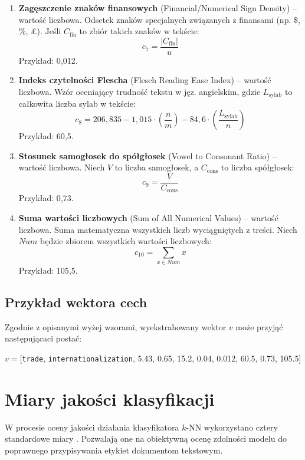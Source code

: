 \documentclass{article}
\begin{document}
\begin{enumerate}
	\item \textbf{Zagęszczenie znaków finansowych} (Financial/Numerical Sign Density) – wartość liczbowa. Odsetek znaków specjalnych związanych z finansami (np. \$, \%, \pounds). Jeśli $C_{\text{fin}}$ to zbiór takich znaków w tekście:
	\begin{equation}
	    c_7 = \frac{|C_{\text{fin}}|}{u}
	\end{equation}
	Przykład: 0{,}012.

	\item \textbf{Indeks czytelności Flescha} (Flesch Reading Ease Index) – wartość liczbowa. Wzór oceniający trudność tekstu w jęz. angielskim, gdzie $L_{\text{sylab}}$ to całkowita liczba sylab w tekście:
	\begin{equation}
	    c_8 = 206{,}835 - 1{,}015 \cdot \left(\frac{n}{m}\right) - 84{,}6 \cdot \left(\frac{L_{\text{sylab}}}{n}\right)
	\end{equation}
	Przykład: 60{,}5.

	\item \textbf{Stosunek samogłosek do spółgłosek} (Vowel to Consonant Ratio) – wartość liczbowa. Niech $V$ to liczba samogłosek, a $C_{\text{cons}}$ to liczba spółgłosek:
	\begin{equation}
	    c_9 = \frac{V}{C_{\text{cons}}}
	\end{equation}
	Przykład: 0{,}73.

	\item \textbf{Suma wartości liczbowych} (Sum of All Numerical Values) – wartość liczbowa. Suma matematyczna wszystkich liczb wyciągniętych z treści. Niech $Num$ będzie zbiorem wszystkich wartości liczbowych:
	\begin{equation}
	    c_{10} = \sum_{x \in Num} x
	\end{equation}
	Przykład: 105{,}5.
\end{enumerate}

\subsection{Przykład wektora cech}
Zgodnie z opisanymi wyżej wzorami, wyekstrahowany wektor $v$ może przyjąć następującaci postać:
\begin{center}
$v =[$\texttt{trade}, \texttt{internationalization}, 5.43, 0.65, 15.2, 0.04, 0.012, 60.5, 0.73, 105.5$]$
\end{center}

\section{Miary jakości klasyfikacji}
W procesie oceny jakości działania klasyfikatora $k$-NN wykorzystano cztery standardowe miary \cite{jakosci}. Pozwalają one na obiektywną ocenę zdolności modelu do poprawnego przypisywania etykiet dokumentom tekstowym.
\end{document}
